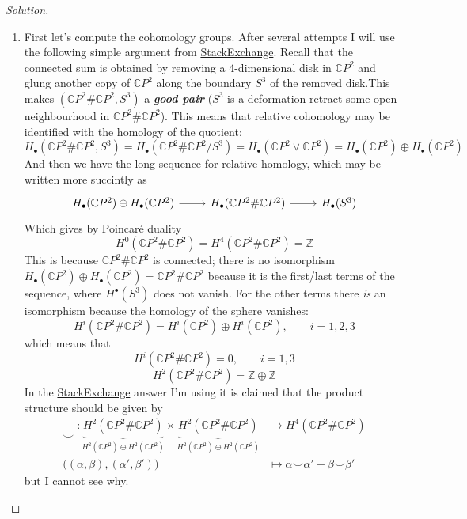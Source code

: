 \begin{proof}[Solution]\leavevmode
	\begin{enumerate}[label=\alph*.]
		\item First let's compute the cohomology groups. After several attempts I will use the following simple argument from \href{https://math.stackexchange.com/questions/3635669/cup-products-in-cohomologies-of-connected-sum-of-copies-of-a-specific-manifold}{StackExchange}.  Recall that the connected sum is obtained by removing a 4-dimensional disk in $\mathbb{C}P^{2}$ and glung another copy of $\mathbb{C}P^{2}$ along the boundary $S^3$ of the removed disk.This makes $(\mathbb{C}P^{2}\#\mathbb{C}P^{2},S^3)$ a \textit{\textbf{good pair}} ($S^3$ is a deformation retract some open neighbourhood in $\mathbb{C}P^{2}\#\mathbb{C}P^{2}$). This means that relative cohomology may be identified with the homology of the quotient:
			\[H_{\bullet}(\mathbb{C}P^2\#\mathbb{C}P^2,S^3)=H_{\bullet}(\mathbb{C}P^2\#\mathbb{C}P^2/S^3)=H_{\bullet}(\mathbb{C}P^2\vee\mathbb{C}P^2)=H_{\bullet}(\mathbb{C}P^{2})\oplus H_\bullet(\mathbb{C}P^{2})\]
			And then we have the long sequence for relative homology, which may be written more succintly as
			\[\begin{tikzcd}H_{\bullet}(\mathbb{C}P^{2})\oplus H_\bullet(\mathbb{C}P^{2})\arrow[r]& H_\bullet(\mathbb{C}P^{2}\#\mathbb{C}P^{2})\arrow[r]&H_\bullet(S^3)\end{tikzcd}\]
			Which gives by Poincaré duality
			\[H^{0}(\mathbb{C}P^2\#\mathbb{C}P^2)=H^{4}(\mathbb{C}P^2\#\mathbb{C}P^2)=\mathbb{Z}\]
			This is because $\mathbb{C}P^{2}\#\mathbb{C}P^{2}$ is connected; there is no isomorphism $H_{\bullet}(\mathbb{C}P^{2})\oplus H_\bullet(\mathbb{C}P^{2})=\mathbb{C}P^2\#\mathbb{C}P^2$ because it is the first/last terms of the sequence, where $H^{\bullet}(S^3)$ does not vanish. For the other terms there \textit{is} an isomorphism because the homology of the sphere vanishes:
			\[H^{i}(\mathbb{C}P^2\#\mathbb{C}P^2)=H^{i}(\mathbb{C}P^{2})\oplus H^{i}(\mathbb{C}P^{2}),\qquad i=1,2,3\]
			which means that
			\[H^{i}(\mathbb{C}P^2\#\mathbb{C}P^2)=0,\qquad i=1,3\]
			\[H^{2}(\mathbb{C}P^2\#\mathbb{C}P^2)=\mathbb{Z}\oplus \mathbb{Z}\]
In the \href{https://math.stackexchange.com/questions/3635669/cup-products-in-cohomologies-of-connected-sum-of-copies-of-a-specific-manifold}{StackExchange} answer I'm using it is claimed that the product structure should be given by 
\begin{align*}
	\smile\;: \underbrace{H^{2}(\mathbb{C}P^2\#\mathbb{C}P^2)}_{H^{2}(\mathbb{C}P^{2})\oplus H^{2}(\mathbb{C}P^{2})}\times \underbrace{H^{2}(\mathbb{C}P^2\#\mathbb{C}P^2)}_{H^{2}(\mathbb{C}P^{2})\oplus H^{2}(\mathbb{C}P^{2})} &\longrightarrow H^{4}(\mathbb{C}P^2\#\mathbb{C}P^2) \\
	\Big((\alpha,\beta),(\alpha',\beta')\Big)\qquad \qquad  &\longmapsto \alpha\smile\alpha'+\beta\smile\beta'
\end{align*}
but I cannot see why.




\end{enumerate}
\end{proof}
